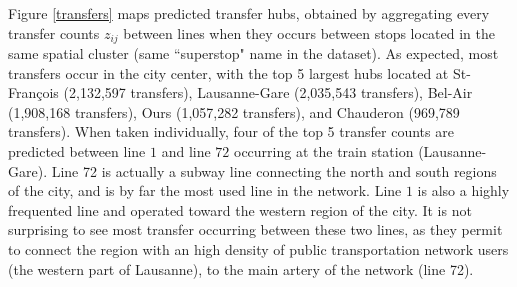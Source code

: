 \documentclass{bmcart}
\begin{document}
Figure \ref{transfers} maps predicted transfer hubs, obtained by aggregating every transfer counts $z_{ij}$ between lines when they occurs between stops located in the same spatial cluster (same ``superstop" name in the dataset). As expected, most transfers occur in the city center, with the top 5 largest hubs located at St-François (2,132,597 transfers), Lausanne-Gare (2,035,543 transfers), Bel-Air (1,908,168 transfers), Ours (1,057,282 transfers), and Chauderon (969,789 transfers). When taken individually, four of the top 5 transfer counts are predicted between line $1$ and line $72$ occurring at the train station (Lausanne-Gare). Line 72 is actually a subway line connecting the north and south regions of the city, and is by far the most used line in the network. Line $1$ is also a highly frequented line and operated toward the western region of the city. It is not surprising to see most transfer occurring between these two lines, as they permit to connect the region with an high density of public transportation network users (the western part of Lausanne), to the main artery of the network (line 72).
\end{document}
